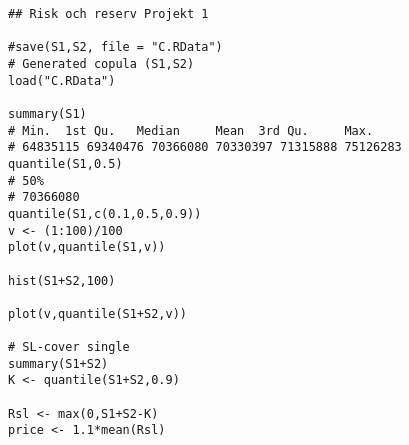 \documentclass[11pt]{article}
\begin{document}
\begin{verbatim}
## Risk och reserv Projekt 1

#save(S1,S2, file = "C.RData")
# Generated copula (S1,S2)
load("C.RData")

summary(S1)
# Min.  1st Qu.   Median     Mean  3rd Qu.     Max. 
# 64835115 69340476 70366080 70330397 71315888 75126283 
quantile(S1,0.5)
# 50% 
# 70366080
quantile(S1,c(0.1,0.5,0.9))
v <- (1:100)/100
plot(v,quantile(S1,v))

hist(S1+S2,100)

plot(v,quantile(S1+S2,v))

# SL-cover single
summary(S1+S2)
K <- quantile(S1+S2,0.9)

Rsl <- max(0,S1+S2-K)
price <- 1.1*mean(Rsl)





\end{verbatim}
\end{document}
